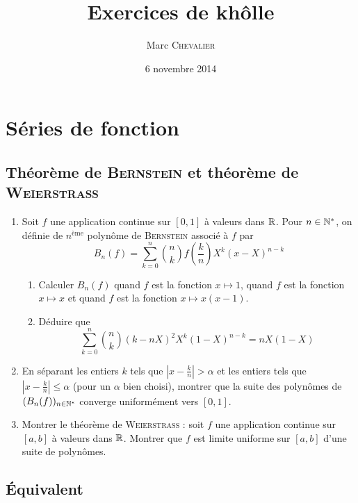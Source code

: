 

\title{Exercices de khôlle}
\author{Marc \textsc{Chevalier}}
\date{6 novembre 2014}


\maketitle
\setcounter{tocdepth}{2}
\tableofcontents

\section{Séries de fonction}

\subsection{Théorème de \textsc{Bernstein} et théorème de \textsc{Weierstrass}}

\begin{enumerate}
    \item Soit $f$ une application continue sur $[0,1]$ à valeurs dans $\mathbb{R}$. Pour $n\in\mathbb{N}^*$, on définie de $n^\text{ème}$ polynôme de \textsc{Bernstein} associé à $f$ par
    \[
        B_n(f) = \sum\limits_{k=0}^n \binom{n}{k} f\left(\frac{k}{n}\right) X^k (x-X)^{n-k}
    \]
    \begin{enumerate}
        \item Calculer $B_n(f)$ quand $f$ est la fonction $x\mapsto 1$, quand $f$ est la fonction $x\mapsto x$ et quand $f$ est la fonction $x\mapsto x(x-1)$.
        \item Déduire que 
            \[
                \sum\limits_{k=0}^n\binom{n}{k}(k-nX)^2X^k(1-X)^{n-k} = nX(1-X)
            \]
    \end{enumerate}
    \item En séparant les entiers $k$ tels que $\left\lvert x- \frac{k}{n} \right\rvert > \alpha$ et les entiers tels que $\left\lvert x- \frac{k}{n} \right\rvert \leqslant \alpha$ (pour un $\alpha$ bien choisi), montrer que la suite des polynômes de $(B_n(f))_{n\in\mathbb{N}^*}$ converge uniformément vers $[0,1]$.
    
    \item Montrer le théorème de \textsc{Weierstrass} : soit $f$ une application continue sur $[a,b]$ à valeurs dans $\mathbb{R}$. Montrer que $f$ est limite uniforme sur $[a,b]$ d'une suite de polynômes.
\end{enumerate}

\subsection{Équivalent}

